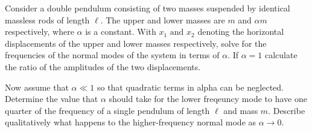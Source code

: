 \documentclass[a4paper,12pt]{report}
\begin{document}
{Consider a double pendulum consisting of two masses suspended by identical massless rods of length \(\ell \). The upper and lower masses are \(m\) and \(\alpha m\) respectively, where \(\alpha \) is a constant. With \(x_1 \text { and } x_2 \) denoting the horizontal displacements of the upper and lower masses respectively, solve for the frequencies of the normal modes of the system in terms of \(\alpha \). If \(\alpha  = 1\) calculate the ratio of the amplitudes of the two displacements. 

Now assume that \(\alpha  \ll  1 \) so that quadratic terms in alpha can be neglected. Determine the value that \(\alpha \) should take for the lower freqeuncy mode to have one quarter of the frequency of a single pendulum of length \(\ell \) and mass \(m\). Describe qualitatively what happens to the higher-frequency normal mode as \(\alpha \to  0\).    }
\end{document}
